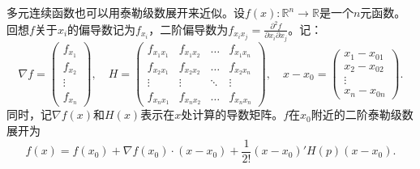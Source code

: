 \begin{translation}
多元连续函数也可以用泰勒级数展开来近似。设$f(x) : \mathbb{R}^n \to \mathbb{R}$是一个$n$元函数。回想$f$关于$x_i$的偏导数记为$f_{x_i}$，二阶偏导数为$f_{x_i x_j} = \frac{\partial^2 f}{\partial x_i \partial x_j}$。记：
\[
\nabla f = \begin{pmatrix} f_{x_1} \\ f_{x_2} \\ \vdots \\ f_{x_n} \end{pmatrix}, \quad
H = \begin{pmatrix}
f_{x_1 x_1} & f_{x_1 x_2} & \dots & f_{x_1 x_n} \\
f_{x_2 x_1} & f_{x_2 x_2} & \dots & f_{x_2 x_n} \\
\vdots & \vdots & \ddots & \vdots \\
f_{x_n x_1} & f_{x_n x_2} & \dots & f_{x_n x_n}
\end{pmatrix}, \quad
x - x_0 = \begin{pmatrix} x_1 - x_{01} \\ x_2 - x_{02} \\ \vdots \\ x_n - x_{0n} \end{pmatrix}.
\]
同时，记$\nabla f(x)$和$H(x)$表示在$x$处计算的导数矩阵。$f$在$x_0$附近的二阶泰勒级数展开为
\[
f(x) = f(x_0) + \nabla f(x_0) \cdot (x - x_0) + \frac{1}{2!}(x - x_0)' H(p)(x - x_0).
\]
\end{translation}

